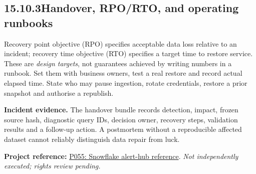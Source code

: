 \documentclass[11pt,twoside]{article}
\newcommand{\topic}[2]{\subsection*{#1\quad #2}}
\newcommand{\repo}[2]{\par\begingroup\fontsize{8.0}{9.6}\selectfont\sffamily\color{inkgray}\textbf{Project reference:} \href{#2}{#1}. \textit{Not independently executed; rights review pending.}\par\endgroup}
\begin{document}
\topic{15.10.3}{Handover, RPO/RTO, and operating runbooks}
Recovery point objective (RPO) specifies acceptable data loss relative to an incident; recovery time objective (RTO) specifies a target time to restore service. These are \emph{design targets}, not guarantees achieved by writing numbers in a runbook. Set them with business owners, test a real restore and record actual elapsed time. State who may pause ingestion, rotate credentials, restore a prior snapshot and authorise a republish.
\begin{insight}\textbf{Incident evidence.} The handover bundle records detection, impact, frozen source hash, diagnostic query IDs, decision owner, recovery steps, validation results and a follow-up action. A postmortem without a reproducible affected dataset cannot reliably distinguish data repair from luck.\end{insight}
\repo{P055: Snowflake alert-hub reference}{https://github.com/Snowflake-Labs/sfguide-alert-hub}

\newpage

\end{document}
